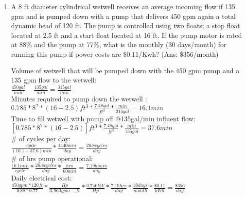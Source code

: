 \begin{enumerate}
\item A 8 ft diameter cylindrical wetwell receives an average incoming flow if 135 gpm and is pumped down with a pump that delivers 450 gpm again a total dynamic head of 120 ft.  The pump is controlled using two floats; a stop float located at 2.5 ft and a start float located at 16 ft.  If the pump motor is rated at 88\% and the pump at 77\%, what is the monthly (30 days/month) for running this pump if power costs are \$0.11/Kwh? (Ans:  \$356/month)


\vspace{0.4cm}
Volume of wetwell that will be pumped down with the 450 gpm pump and a 135 gpm flow to the wetwell:\\
$\frac{450gal}{min}-\frac{135gal}{min}=\frac{315gal}{min}$\\
\vspace{0.4cm}
Minutes required to pump down the wetwell :\\
$0.785*8^2*(16-2.5)ft^3*\frac{7.48gal}{ft^3}*\frac{min}{315gal}=\boxed{16.1min}$\\
\vspace{0.4cm}
Time to fill wetwell with pump off @135gal/min influent flow:
\\
$[0.785*8^2*(16-2.5)]ft^3*\frac{7.48gal}{ft^3}*\frac{min}{135gal}=37.6min$\\
\vspace{0.4cm}
\# of cycles per day:\\
$\frac{cycle}{(16.1+37.6)min}*\frac{1440min}{day}=\frac{26.8cycles}{day}$\\
\vspace{0.4cm}
\# of hrs pump operational:\\
$\frac{16.1min}{cycle}*\frac{26.8 cycles}{day}*\frac{hrs}{60min}=\frac{7.19hours}{day}$\\
\vspace{0.4cm}
Daily electrical cost:\\
$\frac{450gpm*120ft}{0.88*0.77}*\frac{Hp}{3,960 gpm-ft}*\frac{0.746kW}{Hp}*\frac{7.19hrs}{day}*\frac{30days}{month}*\frac{\$0.11}{kWh}=\boxed{\frac{\$356}{day}}$\\
\vspace{1cm}



\end{enumerate}
